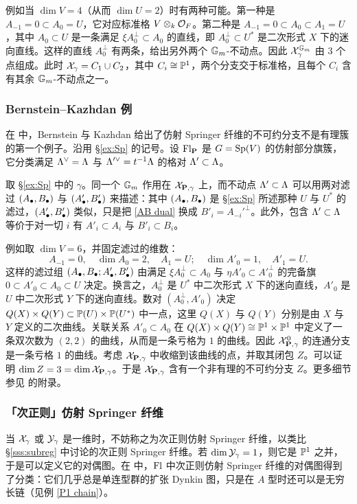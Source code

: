 例如当 $\dim V=4$（从而 $\dim U=2$）时有两种可能。第一种是 $A_{-1}=0\subset A_{0}=U$，它对应标准格 $V\otimes_{k}\mathcal{O}_{F}$。第二种是 $A_{-1}=0\subset A_{0}\subset A_{1}=U$，其中 $A_{0}\subset U$ 是一条满足 $\xi A^{\bot}_{0}\subset A_{0}$ 的直线，即 $A^{\bot}_{0}\subset U^{*}$ 是二次形式 $X$ 下的迷向直线。这样的直线 $A^{\bot}_{0}$ 有两条，给出另外两个 $\mathbb{G}_m$-不动点。因此 $\mathcal{X}_{\gamma}^{\mathbb{G}_m}$ 由 3 个点组成。此时 $\mathcal{X}_{\gamma}=C_{1}\cup C_{2}$，其中 $C_{i}\cong\mathbb{P}^{1}$，两个分支交于标准格，且每个 $C_{i}$ 含有其余 $\mathbb{G}_m$-不动点之一。

\subsubsection{Bernstein--Kazhdan 例}\label{sss:BK example} 在 \cite[附录]{KL} 中，Bernstein 与 Kazhdan 给出了仿射 Springer 纤维的不可约分支不是有理簇的第一个例子。沿用 \S\ref{ex:Sp} 的记号。设 $\textup{Fl}_{\mathbf{P}}$ 是 $G=\textup{Sp}(V)$ 的仿射部分旗簇，它分类满足 $\Lambda^{\vee}=\Lambda$ 与 $\Lambda'^{\vee}=t^{-1}\Lambda$ 的格对 $\Lambda'\subset\Lambda$。

取 \S\ref{ex:Sp} 中的 $\gamma$。同一个 $\mathbb{G}_m$ 作用在 $\mathcal{X}_{\mathbf{P},\gamma}$ 上，而不动点 $\Lambda'\subset \Lambda$ 可以用两对滤过 $(A_{\bullet}, B_{\bullet})$ 与 $(A'_{\bullet}, B'_{\bullet})$ 来描述：其中 $(A_{\bullet}, B_{\bullet})$ 是 \S\ref{ex:Sp} 所述那种 $U$ 与 $U^{*}$ 的滤过，$(A'_{\bullet}, B'_{\bullet})$ 类似，只是把 \eqref{AB dual} 换成 $B'_{i}=A_{-i}'^{\bot}$。此外，包含 $\Lambda'\subset \Lambda$ 等价于对一切 $i$ 有 $A'_{i}\subset A_{i}$ 与 $B'_{i}\subset B_{i}$。

例如取 $\dim V=6$，并固定滤过的维数：
\begin{equation*}
A_{-1}=0, \quad \dim A_{0}=2, \quad A_{1}=U;\quad  \dim A'_{0}=1, \quad A'_{1}=U.
\end{equation*}
这样的滤过组 $(A_{\bullet}, B_{\bullet}; A'_{\bullet}, B'_{\bullet})$ 由满足 $\xi A^{\bot}_{0}\subset A_{0}$ 与 $\eta A'_{0}\subset A'^{\bot}_{0}$ 的完备旗 $0\subset A'_{0}\subset A_{0}\subset U$ 决定。换言之，$A^{\bot}_{0}$ 是 $U^{*}$ 中二次形式 $X$ 下的迷向直线，$A'_{0}$ 是 $U$ 中二次形式 $Y$ 下的迷向直线。数对 $(A^{\bot}_{0}, A'_{0})$ 决定 $Q(X)\times Q(Y)\subset \mathbb{P}(U)\times\mathbb{P}(U^{*})$ 中一点，这里 $Q(X)$ 与 $Q(Y)$ 分别是由 $X$ 与 $Y$ 定义的二次曲线。关联关系 $A'_{0}\subset A_{0}$ 在 $Q(X)\times Q(Y)\cong\mathbb{P}^{1}\times \mathbb{P}^{1}$ 中定义了一条双次数为 $(2,2)$ 的曲线，从而是一条亏格为 $1$ 的曲线。因此 $\mathcal{X}^{0}_{\mathbf{P},\gamma}$ 的连通分支是一条亏格 $1$ 的曲线。考虑 $\mathcal{X}_{\mathbf{P},\gamma}$ 中收缩到该曲线的点，并取其闭包 $Z$。可以证明 $\dim Z=3=\dim\mathcal{X}_{\mathbf{P},\gamma}$。于是 $\mathcal{X}_{\mathbf{P},\gamma}$ 含有一个非有理的不可约分支 $Z$。更多细节参见 \cite{KL} 的附录。

\subsubsection{「次正则」仿射 Springer 纤维}
当 $\mathcal{X}_{\gamma}$ 或 $\mathcal{Y}_{\gamma}$ 是一维时，不妨称之为次正则仿射 Springer 纤维，以类比 \S\ref{sss:subreg} 中讨论的次正则 Springer 纤维。若 $\dim\mathcal{Y}_{\gamma}=1$，则它是 $\mathbb{P}^{1}$ 之并，于是可以定义它的对偶图。在 \cite[命题 7.7]{KL} 中，$\textup{Fl}$ 中次正则仿射 Springer 纤维的对偶图得到了分类：它们几乎总是单连型群的扩张 Dynkin 图，只是在 $A$ 型时还可以是无穷长链（见例 \ref{P1 chain}）。
